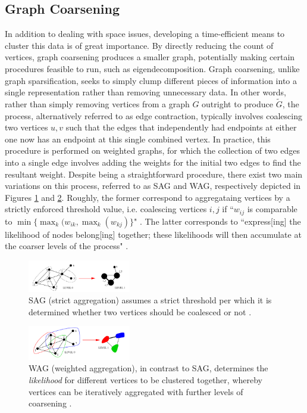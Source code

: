 \documentclass[journal]{IEEEtran}
\begin{document}
\subsection{Graph Coarsening}
In addition to dealing with space issues, developing a time-efficient means to cluster this data is of great importance. By directly reducing the count of vertices, graph coarsening produces a smaller graph, potentially making certain procedures feasible to run, such as eigendecomposition. Graph coarsening, unlike graph sparsification, seeks to simply clump different pieces of information into a single representation rather than removing unnecessary data. In other words, rather than simply removing vertices from a graph $G$ outright to produce $\widetilde{G}$, the process, alternatively referred to as edge contraction, typically involves coalescing two vertices $u,v$ such that the edges that independently had endpoints at either one now has an endpoint at this single combined vertex. In practice, this procedure is performed on weighted graphs, for which the collection of two edges into a single edge involves adding the weights for the initial two edges to find the resultant weight. Despite being a straightforward procedure, there exist two main variations on this process, referred to as SAG and WAG, respectively depicted in Figures \ref{fig:sag} and  \ref{fig:wag}. Roughly, the former correspond to aggregataing vertices by a strictly enforced threshold value, i.e. coalescing vertices $i,j$ if ``$w_{ij}$ is comparable to $\min\{\max_k(w_{ik}, \max_k(w_{kj})\}$" \cite{coarsening}. The latter corresponds to ``express[ing]  the likelihood of nodes belong[ing] together; these likelihoods will then accumulate at the coarser levels of the process" \cite{coarsening}. 

\begin{figure}
    \label{fig:sag}
    \centering
    \includegraphics[width=0.4\textwidth]{sag.png}
    \caption{SAG (strict aggregation) assumes a strict threshold per which it is determined whether two vertices should be coalesced or not \cite{coarsening}.}
\end{figure}

\begin{figure}
    \label{fig:wag}
    \centering
    \includegraphics[width=0.4\textwidth]{wag.png}
    \caption{WAG (weighted aggregation), in contrast to SAG, determines the \textit{likelihood} for different vertices to be clustered together, whereby vertices can be iteratively aggregated with further levels of coarsening \cite{coarsening}.}
\end{figure}
\end{document}
